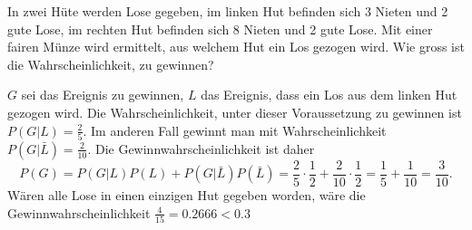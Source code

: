 In zwei Hüte werden Lose gegeben, im linken Hut befinden sich
3 Nieten  und 2 gute Lose, im rechten Hut befinden sich 8 Nieten
und 2 gute Lose. Mit einer fairen Münze wird ermittelt, aus welchem
Hut ein Los gezogen wird. Wie gross ist die Wahrscheinlichkeit, zu
gewinnen?


\begin{loesung}
$G$ sei das Ereignis zu gewinnen,
$L$ das Ereignis, dass ein Los aus dem linken Hut gezogen wird.
Die Wahrscheinlichkeit, unter dieser Voraussetzung zu gewinnen ist
$P(G|L)=\frac25$. Im anderen Fall gewinnt man mit Wahrscheinlichkeit
$P(G|\bar L)=\frac2{10}$. Die Gewinnwahrscheinlichkeit ist daher
\[
P(G)
=
P(G|L)P(L)+P(G|\bar L)P(\bar L)
=
\frac25\cdot \frac12+\frac2{10}\cdot\frac12
=
\frac15
+
\frac1{10}
=
\frac3{10}.
\]
Wären alle Lose in einen einzigen Hut gegeben worden, wäre die
Gewinnwahrscheinlichkeit $\frac{4}{15}=0.2666<0.3$
\end{loesung}

